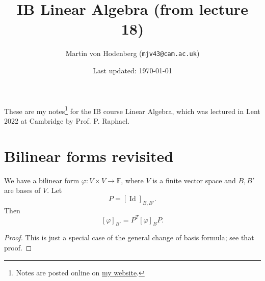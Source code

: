\documentclass[egregdoesnotlikesansseriftitles,a4paper]{scrartcl}
\title{IB Linear Algebra (from lecture 18)}
\author{Martin von Hodenberg (\texttt{mjv43@cam.ac.uk})}
\date{Last updated: \today}
\begin{document}
\maketitle
These are my notes\footnote{Notes are posted online on \href{https://mjv43.user.srcf.net/}{my website}.} for the IB course Linear Algebra, which was lectured in Lent 2022 at Cambridge by Prof. P. Raphael.
\newpage
\tableofcontents
\newpage

\section{Bilinear forms revisited}
\begin{lemma}
    We have a bilinear form $\varphi: V \times V \rightarrow \mathbb{F}$, where $V$ is a finite vector space and $B, B'$ are bases of $V$. Let 
    \[P=[\operatorname{Id}]_{B,B'}.\]
     Then 
    \[[\varphi]_{B'}=P^T [\varphi]_B P.\]
\end{lemma}
\begin{proof}
     This is just a special case of the general change of basis formula; see that proof.
\end{proof}
\end{document}
